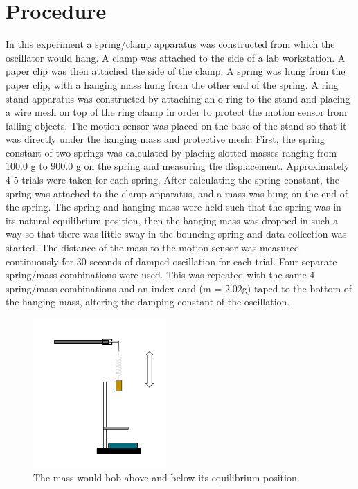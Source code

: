 \documentclass[11pt]{article}
\begin{document}
\section{Procedure}	
In this experiment a spring/clamp apparatus was constructed from which the oscillator would hang. A clamp was attached to the side of a lab workstation. A paper clip was then attached the side of the clamp. A spring was hung from the paper clip, with a hanging mass hung from the other end of the spring. A ring stand apparatus was constructed by attaching an o-ring to the stand and placing a wire mesh on top of the ring clamp in order to protect the motion sensor from falling objects. The motion sensor was placed on the base of the stand so that it was directly under the hanging mass and protective mesh. First, the spring constant of two springs was calculated by placing slotted masses ranging from 100.0 g to 900.0 g on the spring and measuring the displacement. Approximately 4-5 trials were taken for each spring. After calculating the spring constant, the spring was attached to the clamp apparatus, and a mass was hung on the end of the spring. The spring and hanging mass were held such that the spring was in its natural equilibrium position, then the hanging mass was  dropped in such a way so that there was little sway in the bouncing spring and data collection was started. The distance of the mass to the motion sensor was measured continuously for 30 seconds of damped oscillation for each trial. Four separate spring/mass combinations were used. This was repeated with the same 4 spring/mass combinations and an index card (m = 2.02g) taped to the bottom of the hanging mass, altering the damping constant of the oscillation.
\begin{figure}[h]
	\caption{The mass would bob above and below its equilibrium position.}
	\centering
	\includegraphics[width=2in, height=2 in]{Diagram}
\end{figure}
\end{document}
